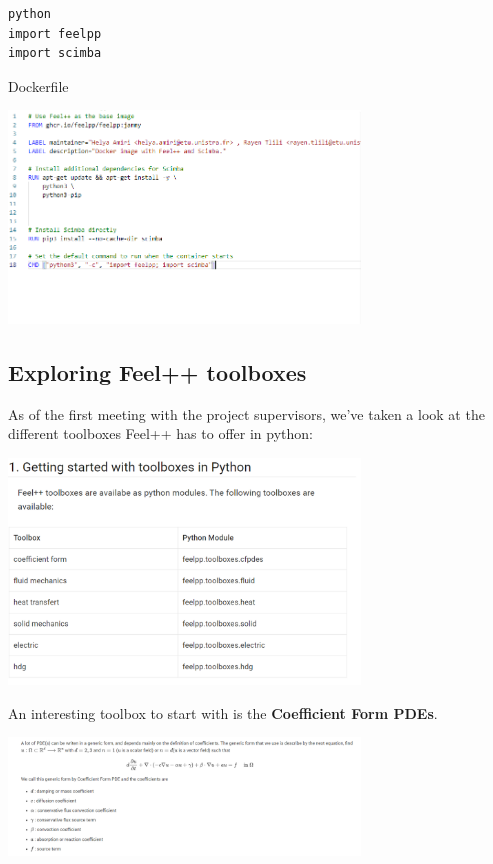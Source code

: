 \documentclass{article}
\begin{document}
\begin{verbatim}
python
import feelpp
import scimba
\end{verbatim}

\begin{frame}{Dockerfile}
    \begin{center}
        \includegraphics[width=0.7\textwidth]{images/dockerfile.png}
    \end{center}
\end{frame}

\subsection{Exploring Feel++ toolboxes}

As of the first meeting with the project supervisors, we've taken a look at the different toolboxes Feel++ has to offer in python:

\begin{frame}{}
    \begin{center}
        \includegraphics[width=0.7\textwidth]{images/pyfeelpptoolboxes.png}
    \end{center}
\end{frame}

An interesting toolbox to start with is the \textbf{Coefficient Form PDEs}.

\begin{frame}{}
    \begin{center}
        \includegraphics[width=0.7\textwidth]{images/cfpde.png}
    \end{center}
\end{frame}
\end{document}
